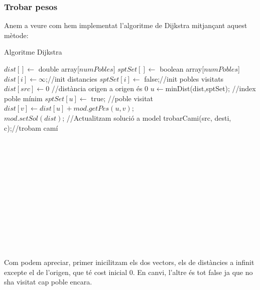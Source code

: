 \documentclass[conference]{IEEEtran}
\begin{document}
        \subsubsection{Trobar pesos}
            Anem a veure com hem implementat l'algoritme de Dijkstra mitjançant aquest mètode:
            \begin{algorithm}
                \caption{Algoritme Dijkstra}
                \begin{algorithmic}[1]
                    \State $dist[] \gets$ double array[$numPobles$]
                    \State $sptSet[] \gets$ boolean array[$numPobles$]
                    \\
                        \State $dist[i] \gets \infty$;//init distancies 
                        \State $sptSet[i] \gets$ false;//init pobles visitats
                    \EndFor
                    \\
                    \State $dist[src] \gets 0$ //distància origen a origen és 0
                        \State $u \gets$minDist(dist,sptSet); //index poble mínim
                        \State $sptSet[u] \gets$ true;        //poble visitat
                                \State $dist[v] \gets dist[u] + mod.getPes(u, v)$; 
                            \EndIf
                        \EndFor
                    \EndFor\\
                    \State $mod.setSol(dist)$;       //Actualitzam solució a model
                    \State trobarCami(src, desti, c);//trobam camí
                \EndProcedure
                \end{algorithmic}
            \end{algorithm}\\\\\\\\\\\\\\\\\\\\\\\\

            Com podem apreciar, primer inicilitzam els dos vectors, els de distàncies a infinit excepte el de l'origen, que té cost inicial 0. En canvi, l'altre és tot false ja que no sha visitat cap poble encara.\\
\end{document}
